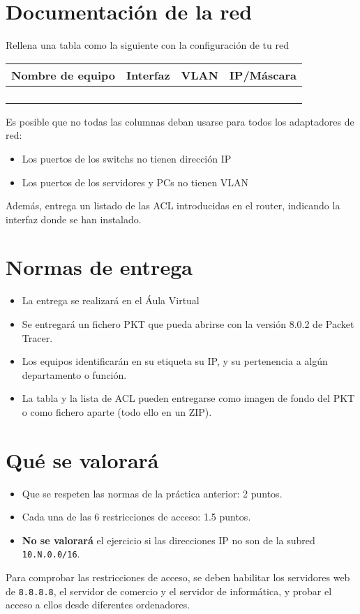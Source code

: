 \section{Documentación de la red}
Rellena una tabla como la siguiente con la configuración de tu red

\begin{center}
  \begin{tabular}{|c|c|c|c|}
    \hline
    Nombre de equipo & Interfaz & VLAN & IP/Máscara \\
    \hline
                     & & & \\
                     & & & \\
                     & & & \\
                     & & & \\
    \hline
  \end{tabular}
\end{center}

Es posible que no todas las columnas deban usarse para todos los adaptadores de red:
\begin{itemize}
\item Los puertos de los switchs no tienen dirección IP
\item Los puertos de los servidores y PCs no tienen VLAN
\end{itemize}

Además, entrega un listado de las ACL introducidas en el router, indicando la interfaz donde se han instalado.

\section{Normas de entrega}
\begin{itemize}
  
\item La entrega se realizará en el Áula Virtual
\item Se entregará un fichero PKT que pueda abrirse con la versión 8.0.2 de Packet Tracer.
\item Los equipos identificarán en su etiqueta su IP, y su pertenencia a algún departamento o función.
\item La tabla y la lista de ACL pueden entregarse como imagen de fondo del PKT o como fichero aparte (todo ello en un ZIP).
\end{itemize}

\section{Qué se valorará}
\begin{itemize}
\item Que se respeten las normas de la práctica anterior: 2 puntos.
\item Cada una de las 6 restricciones de acceso: 1.5 puntos.
\item \textbf{No se valorará} el ejercicio si las direcciones IP no son de la subred \texttt{10.N.0.0/16}.
\end{itemize}

Para comprobar las restricciones de acceso, se deben habilitar los servidores web de \texttt{8.8.8.8}, el servidor de comercio y el servidor de informática, y probar el acceso a ellos desde diferentes ordenadores.




